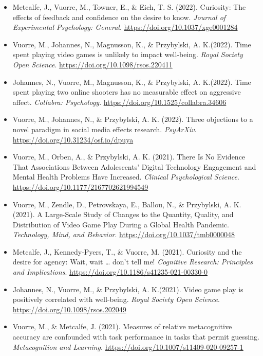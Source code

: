 \documentclass[12pt, a4paper]{article}
\newcommand{\years}[1]{\marginnote{\scriptsize #1}}
\begin{document}
\begin{itemize}
  \item Metcalfe, J., Vuorre, M., Towner, E., \& Eich, T. S. (2022). Curiosity: The effects of feedback and confidence on the desire to know. \emph{Journal of Experimental Psychology: General}. \url{https://doi.org/10.1037/xge0001284}
  \item Vuorre, M.\footnotemark[1], Johannes, N.\footnotemark[1], Magnusson, K., \& Przybylski, A. K.\footnotemark[1] (2022). Time spent playing video games is unlikely to impact well-being. \emph{Royal Society Open Science}. \url{https://doi.org/10.1098/rsos.220411}
  \item Johannes, N.\footnotemark[1], Vuorre, M.\footnotemark[1], Magnusson, K., \& Przybylski, A. K.\footnotemark[1] (2022). Time spent playing two online shooters has no measurable effect on aggressive affect. \emph{Collabra: Psychology}. \url{https://doi.org/10.1525/collabra.34606}
  \item Vuorre, M., Johannes, N., \& Przybylski, A. K. (2022). Three objections to a novel paradigm in social media effects research. \emph{PsyArXiv}. \url{https://doi.org/10.31234/osf.io/dpuya}
  \item \years{2021} Vuorre, M., Orben, A., \& Przybylski, A. K. (2021). There Is No Evidence That Associations Between Adolescents’ Digital Technology Engagement and Mental Health Problems Have Increased. \emph{Clinical Psychological Science}. \\ \url{https://doi.org/10.1177/2167702621994549}
  \item Vuorre, M., Zendle, D., Petrovskaya, E., Ballou, N., \& Przybylski, A. K. (2021). A Large-Scale Study of Changes to the Quantity, Quality, and Distribution of Video Game Play During a Global Health Pandemic. \emph{Technology, Mind, and Behavior}. \url{https://doi.org/10.1037/tmb0000048}
  \item Metcalfe, J., Kennedy-Pyers, T., \& Vuorre, M. (2021). Curiosity and the desire for agency: Wait, wait … don’t tell me! \emph{Cognitive Research: Principles and Implications}. \url{https://doi.org/10.1186/s41235-021-00330-0}
  \item Johannes, N.\footnotemark[1], Vuorre, M.\footnotemark[1], \& Przybylski, A. K.\footnotemark[1] (2021). Video game play is positively correlated with well-being. \emph{Royal Society Open Science}. \url{https://doi.org/10.1098/rsos.202049}
  \item Vuorre, M., \& Metcalfe, J. (2021). Measures of relative metacognitive accuracy are confounded with task performance in tasks that permit guessing. \emph{Metacognition and Learning.} \url{https://doi.org/10.1007/s11409-020-09257-1}


\end{itemize}
\end{document}
